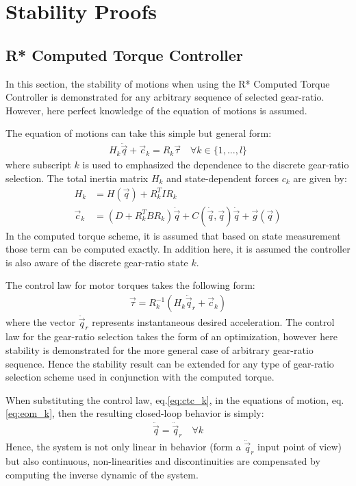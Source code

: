 \newpage
\section{Stability Proofs}
\label{sec:stabproofs}

 
\subsection{R* Computed Torque Controller}
\label{sec:stabrstar1}

In this section, the stability of motions when using the R* Computed Torque Controller is demonstrated for any arbitrary sequence of selected gear-ratio. However, here perfect knowledge of the equation of motions is assumed.

The equation of motions can take this simple but general form:
\begin{align}
H_k \ddot{\vec{q}} + \vec{c}_k = R_k \vec{\tau} \quad \forall k \in \{1,...,l\}
\label{eq:eom_k}
\end{align}
where subscript $k$ is used to emphasized the dependence to the discrete gear-ratio selection. The total inertia matrix $H_k$ and state-dependent forces $c_k$ are given by:
\begin{align}
H_k       &= H(\vec{q}) + R_k^T I R_k \\
\vec{c}_k &= \left( D + R_k^T B R_k \right) \dot{\vec{q}} + C( \dot{\vec{q}} , \vec{q} ) \dot{\vec{q}} + \vec{g}(\vec{q})
\end{align}
In the computed torque scheme, it is assumed that based on state measurement those term can be computed exactly. In addition here, it is assumed the controller is also aware of the discrete gear-ratio state $k$.

The control law for motor torques takes the following form:
\begin{align}
\vec{\tau} = R_k^{-1} \left( H_k \ddot{\vec{q}}_r + \vec{c}_k \right) 
\label{eq:ctc_k}
\end{align}
where the vector $\ddot{\vec{q}}_r$ represents instantaneous desired acceleration. The control law for the gear-ratio selection takes the form of an optimization, however here stability is demonstrated for the more general case of arbitrary gear-ratio sequence. Hence the stability result can be extended for any type of gear-ratio selection scheme used in conjunction with the computed torque. 

When substituting the control law, eq.\eqref{eq:ctc_k}, in the equations of motion, eq.\eqref{eq:eom_k}, then the resulting closed-loop behavior is simply:
\begin{align}
\ddot{\vec{q}} = \ddot{\vec{q}}_r \quad \forall k
\label{eq:cl_k}
\end{align}
Hence, the system is not only linear in behavior (form a $\ddot{\vec{q}}_r$ input point of view) but also continuous, non-linearities and discontinuities are compensated by computing the inverse dynamic of the system.

